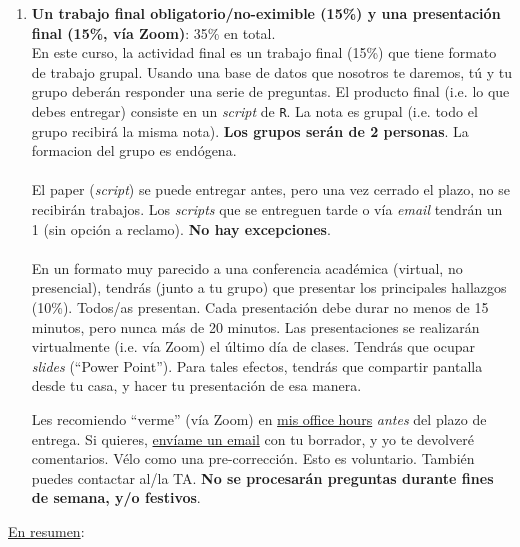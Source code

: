 \documentclass[letterpaper]{article}
\begin{document}
\begin{enumerate}
	\item {\bf Un trabajo final obligatorio/no-eximible (15\%) y una presentaci\'on final (15\%, v\'ia Zoom)}: 35\% en total.\\

		En este curso, la actividad final es un trabajo final (15\%) que tiene formato de trabajo grupal. Usando una base de datos que nosotros te daremos, t\'u y tu grupo deber\'an responder una serie de preguntas. El producto final (i.e. lo que debes entregar) consiste en un \emph{script} de \texttt{R}. La nota es grupal (i.e. todo el grupo recibir\'a la misma nota). {\bf Los grupos ser\'an de 2 personas}. La formacion del grupo es end\'ogena.
\\
\\
		El paper (\emph{script}) se puede entregar antes, pero una vez cerrado el plazo, no se recibir\'an trabajos. Los \emph{scripts} que se entreguen tarde o v\'ia \emph{email} tendr\'an un 1 (sin opci\'on a reclamo). {\bf No hay excepciones}. 
\\
\\
		En un formato muy parecido a una conferencia acad\'emica (virtual, no presencial), tendr\'as (junto a tu grupo) que presentar los principales hallazgos (10\%). Todos/as presentan. Cada presentaci\'on debe durar no menos de 15 minutos, pero nunca m\'as de 20 minutos. Las presentaciones se realizar\'an virtualmente (i.e. v\'ia Zoom) el \'ultimo d\'ia de clases. Tendr\'as que ocupar \emph{slides} (``Power Point''). Para tales efectos, tendr\'as que compartir pantalla desde tu casa, y hacer tu presentaci\'on de esa manera.



Les recomiendo ``verme'' (v\'ia Zoom) en \href{https://calendly.com/bahamonde/officehours}{mis office hours} \emph{antes} del plazo de entrega. Si quieres, \href{mailto:\filetext}{env\'iame un email} con tu borrador, y yo te devolver\'e comentarios. V\'elo como una pre-correcci\'on. Esto es voluntario. Tambi\'en puedes contactar al/la TA. {\bf No se procesar\'an preguntas durante fines de semana, y/o festivos}.


\end{enumerate}


\underline{En resumen}:
\end{document}
